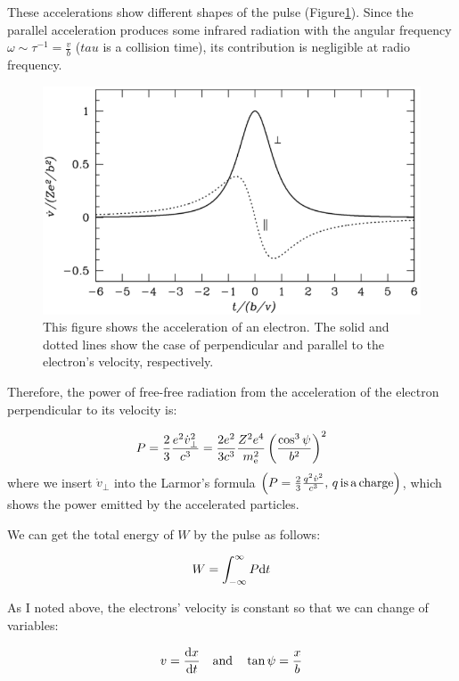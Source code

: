 These accelerations show different shapes of the pulse (Figure\ref{fig:nrao_radio4n3}).
Since the parallel acceleration produces some infrared radiation with the angular frequency $\omega \sim \tau^{-1} = \frac{v}{b}$ ($tau$ is a collision time), its contribution is negligible at radio frequency.

\begin{figure}[htbp]
\centering
	\includegraphics[width=.7\linewidth]{Chapter_2/Figures/NRAO_radio4n3.png}
    \caption[The acceleration of an electron by an ion]{\label{fig:nrao_radio4n3}
        This figure shows the acceleration of an electron.
        The solid and dotted lines show the case of perpendicular and parallel to the electron's velocity, respectively.
    }
\end{figure}

Therefore, the power of free-free radiation from the acceleration of the electron perpendicular to its velocity is:

\begin{equation}\label{eq:essential_radio4n17}
    P=\frac{2}{3} \frac{e^{2} \dot{v}_{\perp}^{2}}{c^{3}}=\frac{2 e^{2}}{3 c^{3}} \frac{Z^{2} e^{4}}{m_{\mathrm{e}}^{2}}\left(\frac{\cos ^{3} \psi}{b^{2}}\right)^{2}
\end{equation}
where we insert $\dot{v}_{\perp}$ into the Larmor's formula $\left(P = \frac{2}{3}\frac{q^2\dot{v}^2}{c^3},\,q\,\mathrm{is\,a\,charge}\right)$, which shows the power emitted by the accelerated particles.

We can get the total energy of $W$ by the pulse as follows:

\begin{equation}\label{eq:essential_radio4n18}
    W = \int^{\infty}_{-\infty} P \mathrm{d}t
\end{equation}

As I noted above, the electrons' velocity is constant so that we can change of variables:

\begin{equation}\label{eq:essential_radio4n19}
    v = \frac{\mathrm{d} x}{\mathrm{d} t}\ \ \ \mathrm{and}\ \ \ \tan\psi = \frac{x}{b}
\end{equation}


